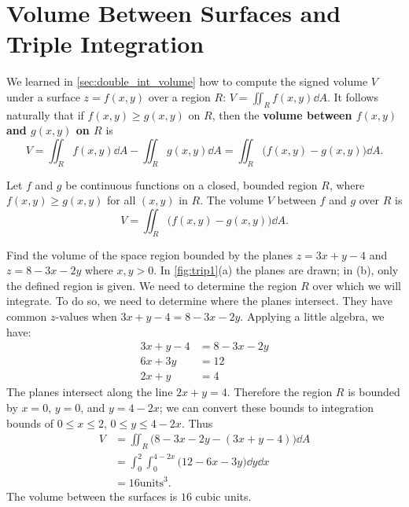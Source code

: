 \section[Volume Between Surfaces and Triple Integration]{\!Volume Between Surfaces and Triple Integration}\label{sec:triple_int}

We learned in \autoref{sec:double_int_volume} how to compute the signed volume $V$ under a surface $z=f(x,y)$ over a region $R$: $V = \iint_R f(x,y)\dd A$. It follows naturally that if $f(x,y)\geq g(x,y)$ on $R$, then the \textbf{volume between $f(x,y)$ and $g(x,y)$ on $R$} is 
\[
V = \iint_R f(x,y)\dd A - \iint_R g(x,y)\dd A = \iint_R \bigl(f(x,y)-g(x,y)\bigr)\dd A.
\]

\begin{theorem}\label{thm:volume_between_surfaces}%
Let $f$ and $g$ be continuous functions on a closed, bounded region $R$, where $f(x,y)\geq g(x,y)$ for all $(x,y)$ in $R$. The volume $V$ between $f$ and $g$ over $R$ is
\[V =\iint_R \bigl(f(x,y)-g(x,y)\bigr)\dd A.\]
\end{theorem}

\begin{example}\label{ex_trip1}%
Find the volume of the space region bounded by the planes $z=3x+y-4$ and $z=8-3x-2y$ where $x,y>0$. In \autoref{fig:trip1}(a) the planes are drawn; in (b), only the defined region is given.
\solution
We need to determine the region $R$ over which we will integrate. To do so, we need to determine where the planes intersect. They have common $z$-values when $3x+y-4=8-3x-2y$. Applying a little algebra, we have:
\begin{align*}
3x+y-4 &= 8-3x-2y\\
6x+3y &=12\\
2x+y &=4
\end{align*}
The planes intersect along the line $2x+y=4$. Therefore the region $R$ is bounded by $x=0$, $y=0$, and $y=4-2x$; we can convert these bounds to integration bounds of $0\leq x\leq 2$, $0\leq y\leq 4-2x$. Thus
\begin{align*}
V &= \iint_R \bigl(8-3x-2y-(3x+y-4)\bigr)\dd A \\
	&= \int_0^2\int_0^{4-2x} \bigl(12-6x-3y\bigr)\dd y\dd x\\
	&= 16\text{units}^3.
\end{align*}
The volume between the surfaces is $16$ cubic units.
\end{example}

